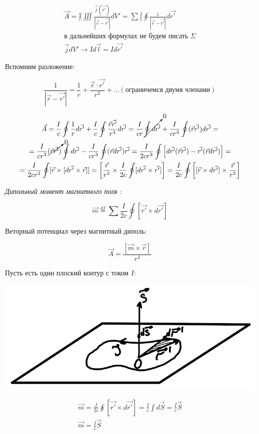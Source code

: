 \begin{gather*}
    \vec{A}=\frac{q}{c} \iiint \frac{\vec{j}(\vec{r'})}{|\vec{r}-\vec{r'}|}dV'=\sum \frac{I}{c}\oint \frac{1}{|\vec{r}-\vec{r'}|}d\vec{r'} \\
    \text{в дальнейших формулах не будем писать }\Sigma \\
    \vec{j}dV'\rightarrow Id\vec{l}=Id\vec{r'} 
\end{gather*}

Вспомним разложение:

\[
\frac{1}{|\vec{r}-\vec{r'}|} =\frac{1}{r}+\frac{\vec{r}\cdot\vec{r'}}{r^3}+\dots (\text{ограничемся двумя членами})
\]

\begin{gather*}
    \vec{A}=\frac{I}{c}\oint \frac{1}{r}d\vec{r'}+ \frac{I}{c}\oint \frac{\vec{r}\vec{r'}}{r^3}d\vec{r'}= \frac{I}{cr}  \cancelto{0}{\oint d\vec{r'}}+ \frac{I}{cr^3} \oint (\vec{r}\vec{r'})d\vec{r'}= \\ 
    =\frac{I}{cr^3} \cancelto{0}{(\vec{r}\vec{r'})}\oint d\vec{r'}-\frac{I}{cr^3}\oint (\vec{r}d\vec{r'})\vec{r'}= \frac{I}{2cr^3} \oint \left[d\vec{r'}(\vec{r}\vec{r'})-\vec{r'}(\vec{r}d\vec{r'})\right] = \\
    =\frac{I}{2cr^3} \oint [\vec{r}\times [d \vec{r'}\times \vec{r}]]=\left[ \frac{\vec{r}}{r^3}\times \frac{I}{2c} \oint [d\vec{r'}\times \vec{r'}]   \right]= \frac{I}{2c} \oint \left[ [\vec{r}\times d\vec{r'}]\times \frac{\vec{r}}{r^3}  \right]      
\end{gather*}

\textit{Дипольный момент магнитного поля : }

\[
\boxed{\vec{m}\overset{df}{=} \sum \frac{I}{2c} \oint [\vec{r'}\times d\vec{r'}] }
\]

Веторный потенциал через магнитный диполь:

\[
\vec{A}=\frac{[\vec{m}\times \vec{r}]}{r^3} 
\]

Пусть есть один  плоский контур с током $I$:

\begin{minipage}[c]{0.5\textwidth} %
    \includegraphics[width=\textwidth]{im/70.png} %
\end{minipage}%
\hfill
\begin{minipage}[c]{0.55\textwidth} %
    \begin{gather*}
        \vec{m}=\frac{I}{2c} \oint [\vec{r'}\times d \vec{r'}]=\frac{I}{c} \int d\vec{S}= \frac{I}{c} \vec{S} \\
        \vec{m}= \frac{I}{c} \vec{S}
    \end{gather*}
\end{minipage}

